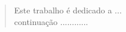 

\vspace{13cm}



\begin{quote}
  \hspace{7cm} Este trabalho é dedicado a ...\\ 
  
  \vspace{-10mm}
   \hspace{7cm}   continuação ............ 
\end{quote}


\clearpage
\pagebreak


